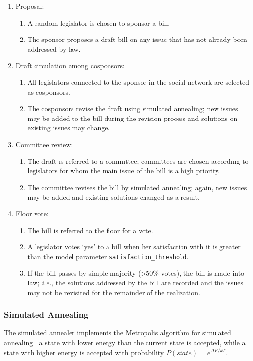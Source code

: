 \documentclass[pdftex,12pt]{llncs}
\begin{document}
\begin{enumerate}
  \item Proposal:
  \begin{enumerate}
    \item A random legislator is chosen to sponsor a bill.
    \item The sponsor proposes a draft bill on any issue that has not already been addressed by law.
  \end{enumerate}
  \item Draft circulation among cosponsors:
  \begin{enumerate}
    \item All legislators connected to the sponsor in the social network are selected as cosponsors.
    \item The cosponsors revise the draft using simulated annealing; new issues may be added to the bill during the revision process and solutions on existing issues may change.
  \end{enumerate}
  \item Committee review:
  \begin{enumerate}
    \item The draft is referred to a committee; committees are chosen according to legislators for whom the main issue of the bill is a high priority.
    \item The committee revises the bill by simulated annealing; again, new issues may be added and existing solutions changed as a result.
  \end{enumerate} 
  \item Floor vote:
    \begin{enumerate}
    \item The bill is referred to the floor for a vote.
    \item A legislator votes `yes' to a bill when her satisfaction with it is greater than the model parameter \texttt{satisfaction\_threshold}.
    \item If the bill passes by simple majority (\textgreater 50\% votes), the bill is made into law; \textit{i.e.}, the solutions addressed by the bill are recorded and the issues may not be revisited for the remainder of the realization.
  \end{enumerate} 
\end{enumerate} 

\subsubsection{Simulated Annealing}
The simulated annealer implements the Metropolis algorithm for simulated annealing \parencite{mrrt53, kgv}: a state with lower energy than the current state is accepted, while a state with higher energy is accepted with probability $P(state) = e^{\Delta E/kT}$.  
\end{document}
